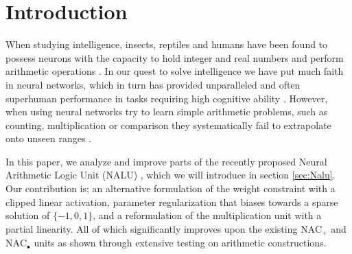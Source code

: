 \section{Introduction}
When studying intelligence, insects, reptiles and humans have been found to possess neurons with the capacity to hold integer and real numbers and perform arithmetic operations \cite{nieder-neuronal-number,rugani-arithmetic-chicks,gallistel-numbers-in-brain}.
In our quest to solve intelligence we have put much faith in neural networks, which in turn has provided unparalleled and often superhuman performance in tasks requiring high cognitive ability \cite{natureGo,googleNMT,resnet}.
However, when using neural networks try to learn simple arithmetic problems, such as counting, multiplication or comparison they systematically fail to extrapolate onto unseen ranges \cite{stillNotSystematic,suzgun2019evaluating,trask-nalu}.

In this paper, we analyze and improve parts of the recently proposed Neural Arithmetic Logic Unit (NALU) \cite{trask-nalu}, which we will introduce in section \ref{sec:Nalu}. Our contribution is; an alternative formulation of the weight constraint with a clipped linear activation, parameter regularization that biases towards a sparse solution of $\{-1,0,1\}$, and a reformulation of the multiplication unit with a partial linearity. All of which significantly improves upon the existing $\text{NAC}_{+}$ and $\text{NAC}_{\bullet}$ units as shown through extensive testing on arithmetic constructions.

